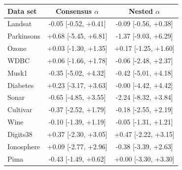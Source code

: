 \begin{tabular}{lcc}
\toprule
Data set & Consensus $\alpha$ & Nested $\alpha$ \\
\midrule
Landsat & -0.05 [-0.52, +0.41] & -0.09 [-0.56, +0.38] \\
Parkinsons & +0.68 [-5.45, +6.81] & -1.37 [-9.03, +6.29] \\
Ozone & +0.03 [-1.30, +1.35] & +0.17 [-1.25, +1.60] \\
WDBC & +0.06 [-1.66, +1.78] & -0.06 [-2.48, +2.37] \\
Musk1 & -0.35 [-5.02, +4.32] & -0.42 [-5.01, +4.18] \\
Diabetes & +0.23 [-3.17, +3.63] & -0.00 [-4.42, +4.42] \\
Sonar & -0.65 [-4.85, +3.55] & -2.24 [-8.32, +3.84] \\
Cultivar & -0.37 [-2.52, +1.79] & -0.18 [-2.55, +2.19] \\
Wine & -0.10 [-1.39, +1.19] & -0.05 [-1.31, +1.21] \\
Digits38 & +0.37 [-2.30, +3.05] & +0.47 [-2.22, +3.15] \\
Ionosphere & +0.09 [-2.77, +2.96] & -0.38 [-3.39, +2.63] \\
Pima & -0.43 [-1.49, +0.62] & +0.00 [-3.30, +3.30] \\
\bottomrule
\end{tabular}
